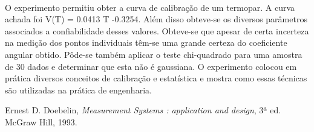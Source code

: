 \documentclass[a4paper,11pt]{article}
\begin{document}
\paragraph{} O experimento permitiu obter a curva de calibração de um termopar. A curva achada foi 	V(T) = 0.0413 T -0.3254. Além disso obteve-se os diversos parâmetros associados a confiabilidade desses valores. Obteve-se que apesar
de certa incerteza na medição dos pontos individuais têm-se uma grande certeza do coeficiente angular obtido. 
Pôde-se também aplicar o teste chi-quadrado para uma amostra de 30 dados e determinar que esta não é
gaussiana. O experimento colocou em prática diversos conceitos de calibração e estatística e mostra como
essas técnicas são utilizadas na prática de engenharia.



\begin{thebibliography}{1}

Ernest D. Doebelin, \emph{Measurement Systems : application and design}, 3ª ed. McGraw Hill, 1993. 
\end{thebibliography}
\end{document}
